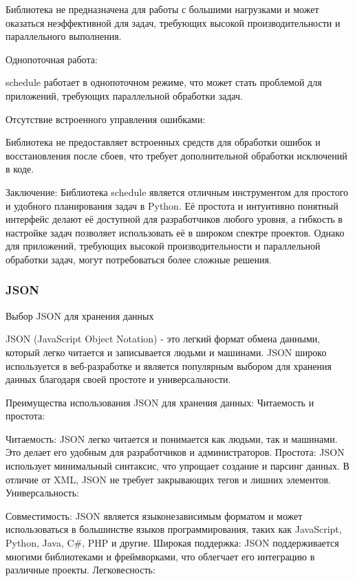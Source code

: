 Библиотека не предназначена для работы с большими нагрузками и может оказаться неэффективной для задач, требующих высокой производительности и параллельного выполнения.

Однопоточная работа:

schedule работает в однопоточном режиме, что может стать проблемой для приложений, требующих параллельной обработки задач.

Отсутствие встроенного управления ошибками:

Библиотека не предоставляет встроенных средств для обработки ошибок и восстановления после сбоев, что требует дополнительной обработки исключений в коде.

Заключение:
Библиотека schedule является отличным инструментом для простого и удобного планирования задач в Python. Её простота и интуитивно понятный интерфейс делают её доступной для разработчиков любого уровня, а гибкость в настройке задач позволяет использовать её в широком спектре проектов. Однако для приложений, требующих высокой производительности и параллельной обработки задач, могут потребоваться более сложные решения.

\subsubsection{JSON}

Выбор JSON для хранения данных

JSON (JavaScript Object Notation) - это легкий формат обмена данными, который легко читается и записывается людьми и машинами. JSON широко используется в веб-разработке и является популярным выбором для хранения данных благодаря своей простоте и универсальности.

Преимущества использования JSON для хранения данных:
Читаемость и простота:

Читаемость: JSON легко читается и понимается как людьми, так и машинами. Это делает его удобным для разработчиков и администраторов.
Простота: JSON использует минимальный синтаксис, что упрощает создание и парсинг данных. В отличие от XML, JSON не требует закрывающих тегов и лишних элементов.
Универсальность:

Совместимость: JSON является языконезависимым форматом и может использоваться в большинстве языков программирования, таких как JavaScript, Python, Java, C\#, PHP и другие.
Широкая поддержка: JSON поддерживается многими библиотеками и фреймворками, что облегчает его интеграцию в различные проекты.
Легковесность:

